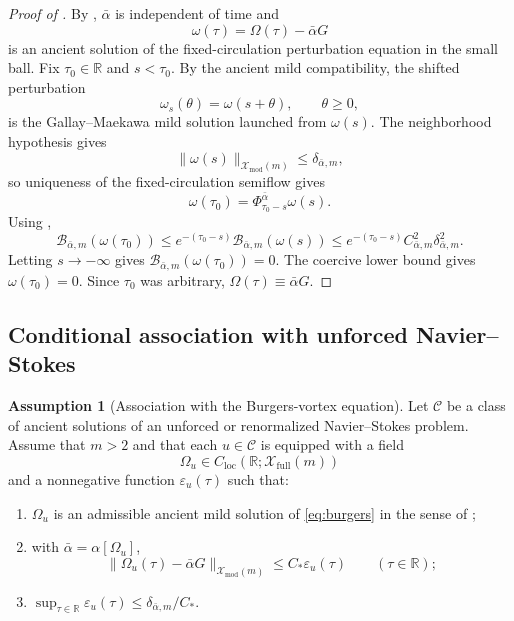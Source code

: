\documentclass[11pt]{amsart}
\theoremstyle{plain}
\theoremstyle{definition}
\newtheorem{assumption}[theorem]{Assumption}
\theoremstyle{remark}
\numberwithin{equation}{section}
\begin{document}
\begin{proof}[Proof of ]
By , \(\bar\alpha\) is independent of time and
\[
   \omega(\tau)=\Omega(\tau)-\bar\alpha G
\]
is an ancient solution of the fixed-circulation perturbation equation in the
small ball.  Fix \(\tau_0\in\mathbb R\) and \(s<\tau_0\).  By the ancient mild
compatibility, the shifted perturbation
\[
   \omega_s(\theta)=\omega(s+\theta),\qquad \theta\ge0,
\]
is the Gallay--Maekawa mild solution launched from \(\omega(s)\).  The
neighborhood hypothesis gives
\[
   \|\omega(s)\|_{\mathcal X_{\mathrm{mod}}(m)}
   \le\delta_{\bar\alpha,m},
\]
so uniqueness of the fixed-circulation semiflow gives
\[
   \omega(\tau_0)=\Phi_{\tau_0-s}^{\bar\alpha}\omega(s).
\]
Using ,
\[
   \mathcal B_{\bar\alpha,m}(\omega(\tau_0))
   \le
   e^{-(\tau_0-s)}
   \mathcal B_{\bar\alpha,m}(\omega(s))
   \le
   e^{-(\tau_0-s)}
   C_{\bar\alpha,m}^2\delta_{\bar\alpha,m}^2 .
\]
Letting \(s\to-\infty\) gives
\(\mathcal B_{\bar\alpha,m}(\omega(\tau_0))=0\).  The coercive lower bound
gives \(\omega(\tau_0)=0\).  Since \(\tau_0\) was arbitrary,
\(\Omega(\tau)\equiv\bar\alpha G\).
\end{proof}

\subsection{Conditional association with unforced Navier--Stokes}

\begin{assumption}[Association with the Burgers-vortex equation]\label{ass:bv-association}
Let \(\mathcal C\) be a class of ancient solutions of an unforced or
renormalized Navier--Stokes problem.  Assume that \(m>2\) and that each
\(u\in\mathcal C\) is equipped with a field
\[
   \Omega_u\in C_{\mathrm{loc}}(\mathbb R;\mathcal X_{\mathrm{full}}(m))
\]
and a nonnegative function \(\varepsilon_u(\tau)\) such that:
\begin{enumerate}[label=\textup{(\roman*)}]
\item \(\Omega_u\) is an admissible ancient mild solution of
\eqref{eq:burgers} in the sense of ;
\item with \(\bar\alpha=\alpha[\Omega_u]\),
\[
   \|\Omega_u(\tau)-\bar\alpha G\|_{\mathcal X_{\mathrm{mod}}(m)}
   \le C_* \varepsilon_u(\tau)
   \qquad(\tau\in\mathbb R);
\]
\item \(\sup_{\tau\in\mathbb R}\varepsilon_u(\tau)\le
\delta_{\bar\alpha,m}/C_*\).
\end{enumerate}
\end{assumption}
\end{document}
